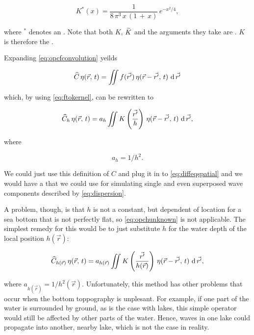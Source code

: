 \begin{equation} \label{eq:empirical}
K^*(x) = \frac{1}{8\,\pi^3\,x\,(1\,+\,x)}\,e^{-x^2/4},
\end{equation}

where $^*$ denotes an \estimation. Note that both $K$, $\widetilde{K}$ and the arguments they take are . $K$ is therefore the .

%
%

Expanding \eqref{eq:opcfconvolution} yeilds

\begin{equation} \label{eq:opcfintegral}
\widehat{C}\,\eta(\vec{r},\,t) = \int\!\!\!\!\int f(\vec{r'})\,\eta(\vec{r}-\vec{r'},\,t)\,\operatorname{d}\vec{r'}
\end{equation}

which, by using \eqref{eq:ftokernel}, can be rewritten to

\begin{equation} \label{eq:opchunknown}
\widehat{C}_h\,\eta(\vec{r},\,t) = a_h\int\!\!\!\!\int K\left(\frac{\vec{r'}}{h}\right)\,\eta(\vec{r}-\vec{r'},\,t)\,\operatorname{d}\vec{r'},
\end{equation}

where

\begin{equation} \label{eq:aofh}
a_h = 1/h^2.
\end{equation}

We could just use this definition of $C$ and plug it in to \eqref{eq:diffeqspatial} and we would have a \PDE that we could use for simulating single and even superposed wave components described by \eqref{eq:dispersion}.

A problem, though, is that $h$ is not a constant, but dependent of location for a sea bottom that is not perfectly flat, so \eqref{eq:opchunknown} is not applicable. The simplest remedy for this would be to just substitute $h$ for the water depth of the local position $h(\vec{r})$:

\begin{equation} \label{eq:opchlocal}
\widehat{C}_{h(\vec{r})}\,\eta(\vec{r},\,t) = a_{h(\vec{r})}\int\!\!\!\!\int K\left(\frac{\vec{r'}}{h(\vec{r})}\right)\,\eta(\vec{r}-\vec{r'},\,t)\,\operatorname{d}\vec{r'},
\end{equation}

where $a_{h(\vec{r})} = 1/h^2(\vec{r})$. Unfortunately, this method has other problems that occur when the bottom toppography is unplesant. For example, if one part of the water is surrounded by ground, as is the case with lakes, this simple operator would still be affected by other parts of the water. Hence, waves in one lake could propagate into another, nearby lake, which is not the case in reality.

